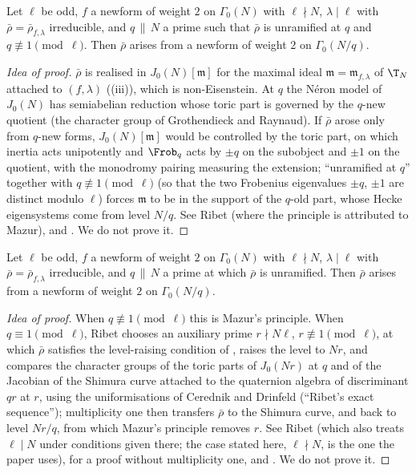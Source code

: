 \begin{theorem}\label{thm:modgalrep:mazur-principle}
Let $\ell$ be odd, $f$ a newform of weight $2$ on $\Gamma_0(N)$ with $\ell\nmid N$, $\lambda\mid\ell$ with $\bar\rho=\bar\rho_{f,\lambda}$ irreducible, and $q\,\|\,N$ a prime such that $\bar\rho$ is
unramified at $q$ and $q\not\equiv1\pmod\ell$. Then $\bar\rho$ arises from a newform of weight $2$ on $\Gamma_0(N/q)$.
\end{theorem}

\begin{proof}[Idea of proof]
$\bar\rho$ is realised in $J_0(N)[\mathfrak m]$ for the maximal ideal $\mathfrak m=\mathfrak m_{f,\lambda}$ of $\T_N$ attached to $(f,\lambda)$ ((iii)), which is
non-Eisenstein. At $q$ the N\'eron model of $J_0(N)$ has semiabelian
reduction whose toric part is governed by the $q$-new quotient (the character group of Grothendieck and Raynaud). If $\bar\rho$ arose only from
$q$-new forms, $J_0(N)[\mathfrak m]$ would be controlled by the toric part, on which inertia acts unipotently and $\Frob_q$ acts by $\pm q$ on the subobject and $\pm1$ on
the quotient, with the monodromy pairing measuring the extension; ``unramified at $q$'' together with $q\not\equiv1\pmod\ell$ (so that the two Frobenius
eigenvalues $\pm q$, $\pm1$ are distinct modulo $\ell$) forces $\mathfrak m$ to be in the support of the $q$-old part, whose Hecke eigensystems come from level $N/q$.
See Ribet \cite{Ribet90} (where the principle is attributed to Mazur), \cite{Mazur77} and \cite{DDT}. We do not prove it.
\end{proof}

\begin{theorem}\label{thm:modgalrep:ribet}
Let $\ell$ be odd, $f$ a newform of weight $2$ on $\Gamma_0(N)$ with $\ell\nmid N$, $\lambda\mid\ell$ with $\bar\rho=\bar\rho_{f,\lambda}$ irreducible, and $q\,\|\,N$ a prime at which $\bar\rho$ is
unramified. Then $\bar\rho$ arises from a newform of weight $2$ on $\Gamma_0(N/q)$.
\end{theorem}

\begin{proof}[Idea of proof]
When $q\not\equiv1\pmod\ell$ this is Mazur's principle. When $q\equiv1\pmod\ell$, Ribet chooses an auxiliary prime $r\nmid N\ell$, $r\not\equiv1\pmod\ell$, at which $\bar\rho$ satisfies the
level-raising condition of , raises the level to $Nr$, and compares the character groups of the toric parts of
$J_0(Nr)$ at $q$ and of the Jacobian of the Shimura curve attached to the quaternion algebra of discriminant $qr$ at $r$, using the uniformisations
of Cerednik and Drinfeld (``Ribet's exact sequence''); multiplicity one then transfers $\bar\rho$ to the Shimura curve, and back to level $Nr/q$, from
which Mazur's principle removes $r$. See Ribet \cite{Ribet90} (which also treats $\ell\mid N$ under conditions given there; the case stated here, $\ell\nmid N$, is
the one the paper uses), \cite{Ribet91} for a proof without multiplicity one, and \cite{DDT}. We do not prove it.
\end{proof}

